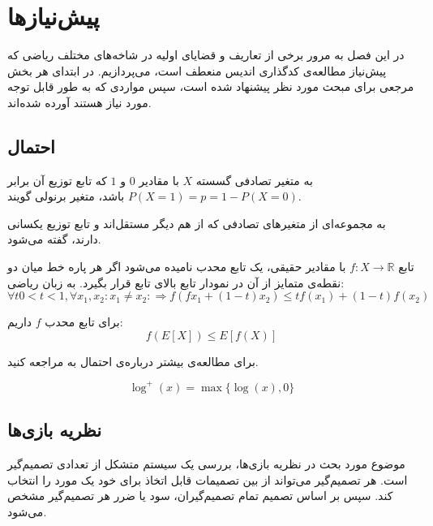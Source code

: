 \chapter{پیش‌نیازها}
\label{chapter:preliminaries}
در این فصل به مرور برخی از تعاریف و قضایای اولیه در شاخه‌های مختلف ریاضی که پیش‌نیاز مطالعه‌ی کدگذاری اندیس منعطف است، می‌پردازیم. در ابتدای هر بخش مرجعی برای مبحث مورد نظر پیشنهاد شده است، سپس مواردی که به طور قابل توجه‌ مورد نیاز هستند آورده شده‌اند.

\section{احتمال}
\begin{definition}
	به متغیر تصادفی گسسته
	$X$
	با مقادیر
	$0$
	و
	$1$
	که تابع توزیع آن برابر
	$P(X = 1) = p = 1 - P(X = 0)$
	باشد، متغیر برنولی گویند.
\end{definition}
\begin{definition}
به مجموعه‌ای از متغیرهای تصادفی که از هم دیگر مستقل‌‌اند و تابع توزیع یکسانی دارند، گفته می‌شود.
\end{definition}
\begin{definition}
	تابع
	$f: X \rightarrow \mathbb{R}$
	با مقادیر حقیقی، یک تابع محدب نامیده می‌شود اگر هر پاره خط میان دو نقطه‌ی متمایز از آن در نمودار تابع بالای تابع قرار بگیرد. به زبان ریاضی:
	$$\forall t 0 < t < 1, \forall x_1, x_2: x_1 \ne x_2: \Rightarrow f(f x_1 + (1 - t) x_2) \leq tf(x_1) + (1 - t) f(x_2)$$
\end{definition}
\begin{theorem}
	\label{Jensen}
	برای تابع محدب
	$f$
	داریم:
	$$f(E[X]) \leq E[f(X)]$$
	
	برای مطالعه‌ی بیشتر درباره‌ی احتمال به
	\cite{book:pro}
	مراجعه کنید.
\end{theorem}
\begin{notation}[$\log^{+}$]
	$$\log^{+}(x) = \max\{\log(x), 0\}$$
\end{notation}

\section{نظریه بازی‌ها}
موضوع مورد بحث در نظریه بازی‌ها، بررسی یک سیستم متشکل از تعدادی تصمیم‌گیر است. هر تصمیم‌گیر می‌تواند از بین تصمیمات قابل اتخاذ برای خود یک مورد را انتخاب کند. سپس بر اساس تصمیم تمام تصمیم‌گیران، سود یا ضرر هر تصمیم‌گیر مشخص می‌شود.

